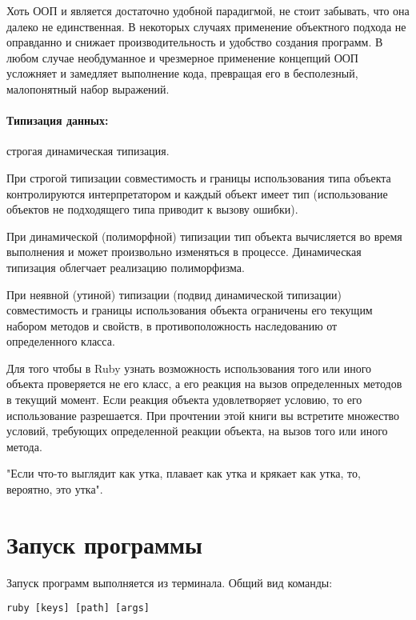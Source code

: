 \begin{note}
  Хоть ООП и является достаточно удобной парадигмой, не стоит забывать, что она далеко не единственная. В некоторых случаях применение объектного подхода не оправданно и снижает производительность и удобство создания программ. В любом случае необдуманное и чрезмерное применение концепций ООП усложняет и замедляет выполнение кода, превращая его в бесполезный, малопонятный набор выражений.
\end{note}

\paragraph*{Типизация данных:} строгая динамическая типизация.

При строгой типизации совместимость и границы использования типа объекта контролируются интерпретатором и каждый объект имеет тип (использование объектов не подходящего типа приводит к вызову ошибки).

При динамической (полиморфной) типизации тип объекта вычисляется во время выполнения и может произвольно изменяться в процессе. Динамическая типизация облегчает реализацию полиморфизма.

При неявной (утиной) типизации (подвид динамической типизации) совместимость и границы использования объекта ограничены его текущим набором методов и свойств, в противоположность наследованию от определенного класса. 

Для того чтобы в Ruby узнать возможность использования того или иного объекта проверяется не его класс, а его реакция на вызов определенных методов в текущий момент. Если реакция объекта удовлетворяет условию, то его использование разрешается. При прочтении этой книги вы встретите множество условий, требующих определенной реакции объекта, на вызов того или иного метода.

\begin{note}
  "Если что-то выглядит как утка, плавает как утка и крякает как утка, то, вероятно, это утка".
\end{note}

\section{Запуск программы}

Запуск программ выполняется из терминала. Общий вид команды:

{\medskip\noindent\verb!ruby [keys] [path] [args]!}

